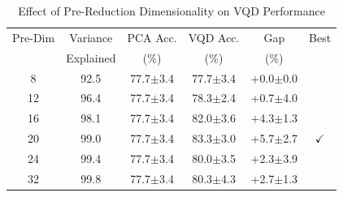 \begin{table}[ht]
\centering
\caption{Effect of Pre-Reduction Dimensionality on VQD Performance}
\label{tab:prereduction}
\begin{tabular}{c c c c c c}
\hline
Pre-Dim & Variance & PCA Acc. & VQD Acc. & Gap & Best \\
        & Explained & (\%)     & (\%)     & (\%) & \\
\hline
8 & 92.5 & 77.7$\pm$3.4 & 77.7$\pm$3.4 & +0.0$\pm$0.0 &  \\
12 & 96.4 & 77.7$\pm$3.4 & 78.3$\pm$2.4 & +0.7$\pm$4.0 &  \\
16 & 98.1 & 77.7$\pm$3.4 & 82.0$\pm$3.6 & +4.3$\pm$1.3 &  \\
20 & 99.0 & 77.7$\pm$3.4 & 83.3$\pm$3.0 & +5.7$\pm$2.7 & $\checkmark$ \\
24 & 99.4 & 77.7$\pm$3.4 & 80.0$\pm$3.5 & +2.3$\pm$3.9 &  \\
32 & 99.8 & 77.7$\pm$3.4 & 80.3$\pm$4.3 & +2.7$\pm$1.3 &  \\
\hline
\end{tabular}
\end{table}